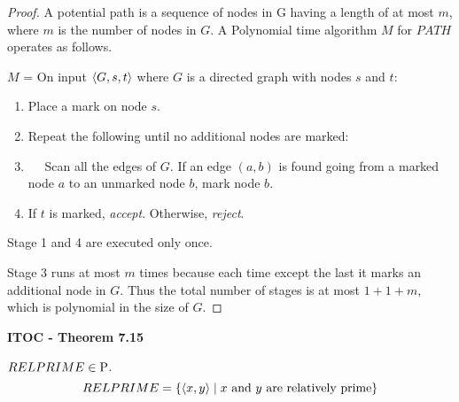 \begin{mdframed}
\begin{proof}
A potential path is a sequence of nodes in G having a length of at most $m$, where $m$ is the number of nodes in $G$. A Polynomial time algorithm $M$ for $PATH$ operates as follows.

\medskip
$M$ = On input $\desc{G, s, t}$ where $G$ is a directed graph with nodes $s$ and  $t$:
\begin{enumerate}
\item Place a mark on node $s$.
\item Repeat the following until no additional nodes are marked:
\item $\quad$ Scan all the edges of $G$. If an edge $(a, b)$ is found going from a marked node $a$ to an unmarked node $b$, mark node $b$.
\item If $t$ is marked, \textit{accept}. Otherwise, \textit{reject}.
\end{enumerate}
Stage 1 and 4 are executed only once.

Stage 3 runs at most $m$ times because each time except the last it marks an additional node in $G$. Thus the total number of stages is at most $1 + 1 + m$, which is polynomial in the size of $G$.
\end{proof}
\end{mdframed}

\label{lang:RELPRIME_P}
\begin{shaded}
\textbf{ITOC - Theorem 7.15}

\medskip
$RELPRIME \in \P$.
\[
RELPRIME = \{\desc{x, y} \mid \text{$x$ and $y$ are relatively prime} \}
\]
\end{shaded}
\label{lang:RELPRIME_P}


